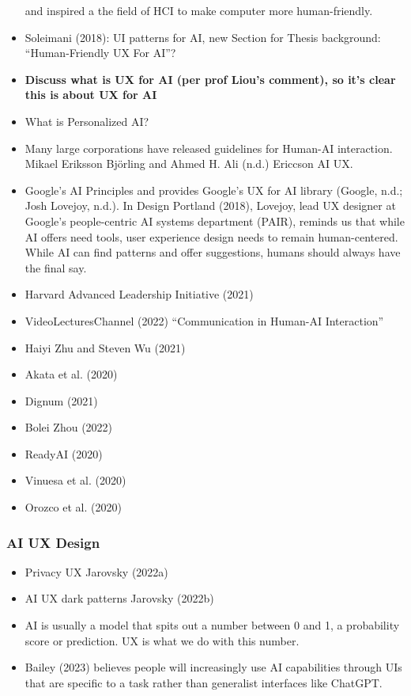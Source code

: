 \documentclass[
  letterpaper,
  DIV=11,
  numbers=noendperiod]{scrartcl}
\begin{document}
\begin{itemize}
  and inspired a the field of HCI to make computer more human-friendly.
\item
  Soleimani (2018): UI patterns for AI, new Section for Thesis
  background: ``Human-Friendly UX For AI''?
\item
  \textbf{Discuss what is UX for AI (per prof Liou's comment), so it's
  clear this is about UX for AI}
\item
  What is Personalized AI?
\item
  Many large corporations have released guidelines for Human-AI
  interaction. Mikael Eriksson Björling and Ahmed H. Ali (n.d.) Ericcson
  AI UX.
\item
  Google's AI Principles and provides Google's UX for AI library
  (Google, n.d.; Josh Lovejoy, n.d.). In Design Portland (2018),
  Lovejoy, lead UX designer at Google's people-centric AI systems
  department (PAIR), reminds us that while AI offers need tools, user
  experience design needs to remain human-centered. While AI can find
  patterns and offer suggestions, humans should always have the final
  say.
\item
  Harvard Advanced Leadership Initiative (2021)
\item
  VideoLecturesChannel (2022) ``Communication in Human-AI Interaction''
\item
  Haiyi Zhu and Steven Wu (2021)
\item
  Akata et al. (2020)
\item
  Dignum (2021)
\item
  Bolei Zhou (2022)
\item
  ReadyAI (2020)
\item
  Vinuesa et al. (2020)
\item
  Orozco et al. (2020)
\end{itemize}

\subsubsection{AI UX Design}\label{ai-ux-design}

\begin{itemize}
\item
  Privacy UX Jarovsky (2022a)
\item
  AI UX dark patterns Jarovsky (2022b)
\item
  AI is usually a model that spits out a number between 0 and 1, a
  probability score or prediction. UX is what we do with this number.
\item
  Bailey (2023) believes people will increasingly use AI capabilities
  through UIs that are specific to a task rather than generalist
  interfaces like ChatGPT.
\end{itemize}
\end{document}
